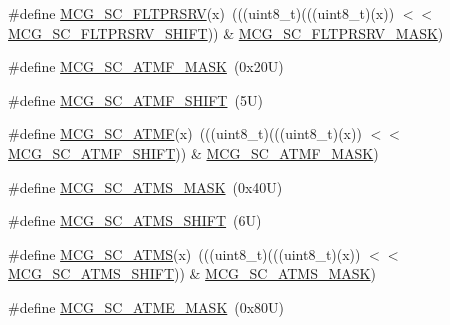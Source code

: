 \begin{DoxyCompactItemize}
\item 
\#define \mbox{\hyperlink{group___m_c_g___register___masks_ga0cfb3c172fe06a1ef6421e4ef2d446e4}{M\+C\+G\+\_\+\+S\+C\+\_\+\+F\+L\+T\+P\+R\+S\+RV}}(x)~(((uint8\+\_\+t)(((uint8\+\_\+t)(x)) $<$$<$ \mbox{\hyperlink{group___m_c_g___register___masks_gac75a3cb915913ba4acc64a098bba4eb5}{M\+C\+G\+\_\+\+S\+C\+\_\+\+F\+L\+T\+P\+R\+S\+R\+V\+\_\+\+S\+H\+I\+FT}})) \& \mbox{\hyperlink{group___m_c_g___register___masks_ga1eea80f4646116c2ca2a68aa3469436a}{M\+C\+G\+\_\+\+S\+C\+\_\+\+F\+L\+T\+P\+R\+S\+R\+V\+\_\+\+M\+A\+SK}})
\item 
\#define \mbox{\hyperlink{group___m_c_g___register___masks_ga15326687d7d214b4847a3cae6e6cdfaa}{M\+C\+G\+\_\+\+S\+C\+\_\+\+A\+T\+M\+F\+\_\+\+M\+A\+SK}}~(0x20\+U)
\item 
\#define \mbox{\hyperlink{group___m_c_g___register___masks_gac7fd1ff91fc1de6800a18f875398d966}{M\+C\+G\+\_\+\+S\+C\+\_\+\+A\+T\+M\+F\+\_\+\+S\+H\+I\+FT}}~(5\+U)
\item 
\#define \mbox{\hyperlink{group___m_c_g___register___masks_ga23e47c874463e34ac6ba3cbff56243b1}{M\+C\+G\+\_\+\+S\+C\+\_\+\+A\+T\+MF}}(x)~(((uint8\+\_\+t)(((uint8\+\_\+t)(x)) $<$$<$ \mbox{\hyperlink{group___m_c_g___register___masks_gac7fd1ff91fc1de6800a18f875398d966}{M\+C\+G\+\_\+\+S\+C\+\_\+\+A\+T\+M\+F\+\_\+\+S\+H\+I\+FT}})) \& \mbox{\hyperlink{group___m_c_g___register___masks_ga15326687d7d214b4847a3cae6e6cdfaa}{M\+C\+G\+\_\+\+S\+C\+\_\+\+A\+T\+M\+F\+\_\+\+M\+A\+SK}})
\item 
\#define \mbox{\hyperlink{group___m_c_g___register___masks_gaf5a12b51cc62a0ce10f3fbecdebd0222}{M\+C\+G\+\_\+\+S\+C\+\_\+\+A\+T\+M\+S\+\_\+\+M\+A\+SK}}~(0x40\+U)
\item 
\#define \mbox{\hyperlink{group___m_c_g___register___masks_ga9a8ce406d5868276e9c3b37190ab89b1}{M\+C\+G\+\_\+\+S\+C\+\_\+\+A\+T\+M\+S\+\_\+\+S\+H\+I\+FT}}~(6\+U)
\item 
\#define \mbox{\hyperlink{group___m_c_g___register___masks_ga3e28d781058567f53900eb505140e797}{M\+C\+G\+\_\+\+S\+C\+\_\+\+A\+T\+MS}}(x)~(((uint8\+\_\+t)(((uint8\+\_\+t)(x)) $<$$<$ \mbox{\hyperlink{group___m_c_g___register___masks_ga9a8ce406d5868276e9c3b37190ab89b1}{M\+C\+G\+\_\+\+S\+C\+\_\+\+A\+T\+M\+S\+\_\+\+S\+H\+I\+FT}})) \& \mbox{\hyperlink{group___m_c_g___register___masks_gaf5a12b51cc62a0ce10f3fbecdebd0222}{M\+C\+G\+\_\+\+S\+C\+\_\+\+A\+T\+M\+S\+\_\+\+M\+A\+SK}})
\item 
\#define \mbox{\hyperlink{group___m_c_g___register___masks_gaf9545e815c86bd04d8513af024cb8617}{M\+C\+G\+\_\+\+S\+C\+\_\+\+A\+T\+M\+E\+\_\+\+M\+A\+SK}}~(0x80\+U)
$$
\end{DoxyCompactItemize}
